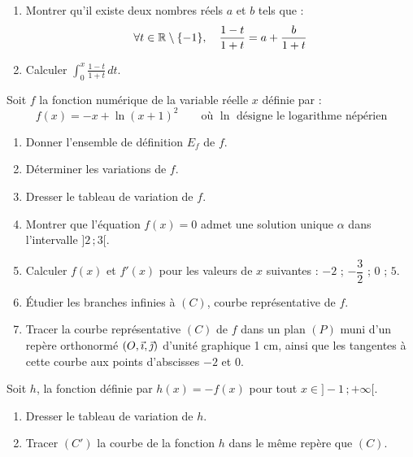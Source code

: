 \documentclass[11pt]{article}
\begin{document}

\begin{enumerate}
  \item Montrer qu'il existe deux nombres réels $a$ et $b$ tels que :
  \[ \forall t \in \mathbb{R} \setminus \{-1\},\quad \frac{1 - t}{1 + t} = a + \frac{b}{1 + t} \]
  \item Calculer $\displaystyle\int_0^x \frac{1 - t}{1 + t}\,dt$.
\end{enumerate}

Soit $f$ la fonction numérique de la variable réelle $x$ définie par :
\[ f(x) = -x + \ln(x + 1)^2 \qquad \text{où } \ln \text{ désigne le logarithme népérien} \]

\begin{enumerate}
  \item Donner l'ensemble de définition $E_f$ de $f$.
  \item Déterminer les variations de $f$.
  \item Dresser le tableau de variation de $f$.
  \item Montrer que l'équation $f(x) = 0$ admet une solution unique $\alpha$ dans l'intervalle $]2\,;3[$.
  \item Calculer $f(x)$ et $f'(x)$ pour les valeurs de $x$ suivantes : $-2$ ; $-\dfrac{3}{2}$ ; $0$ ; $5$.
  \item Étudier les branches infinies à $(C)$, courbe représentative de $f$.
  \item Tracer la courbe représentative $(C)$ de $f$ dans un plan $(P)$ muni d'un repère orthonormé $(O,\vec{\imath},\vec{\jmath})$ d'unité graphique 1 cm, ainsi que les tangentes à cette courbe aux points d'abscisses $-2$ et $0$.
\end{enumerate}

Soit $h$, la fonction définie par $h(x) = -f(x)$ pour tout $x \in ]-1\,;+\infty[$.

\begin{enumerate}
  \item Dresser le tableau de variation de $h$.
  \item Tracer $(C')$ la courbe de la fonction $h$ dans le même repère que $(C)$.
\end{enumerate}
\end{document}
